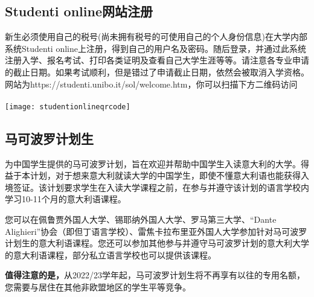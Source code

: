 \subsection{Studenti online网站注册}
新生必须使用自己的税号(尚未拥有税号的可使用自己的个人身份信息)在大学内部系统Studenti online上注册，得到自己的用户名及密码。随后登录，并通过此系统注册入学、报名考试、打印各类证明及查看自己大学生涯等等。请注意各专业申请的截止日期。如果考试顺利，但是错过了申请截止日期，依然会被取消入学资格。\\
网站为https://studenti.unibo.it/sol/welcome.htm，你可以扫描下方二维码访问\\
\\
\texttt{[image: studentionlineqrcode]}\\

\subsection{马可波罗计划生}
为中国学生提供的马可波罗计划，旨在欢迎并帮助中国学生入读意大利的大学。得益于本计划，对于想来意大利就读大学的中国学生，即使不懂意大利语也能获得入境签证。该计划要求学生在入读大学课程之前，在参与并遵守该计划的语言学校内学习10-11个月的意大利语课程。


您可以在佩鲁贾外国人大学、锡耶纳外国人大学、罗马第三大学、“Dante Alighieri”协会（即但丁语言学校）、雷焦卡拉布里亚外国人大学参加针对马可波罗计划生的意大利语课程。您还可以参加其他参与并遵守马可波罗计划的意大利大学的意大利语课程，部分私立语言学校也可以提供该课程。


\textbf{值得注意的是，}从2022/23学年起，马可波罗计划生将不再享有以往的专用名额，您需要与居住在其他非欧盟地区的学生平等竞争。\\

